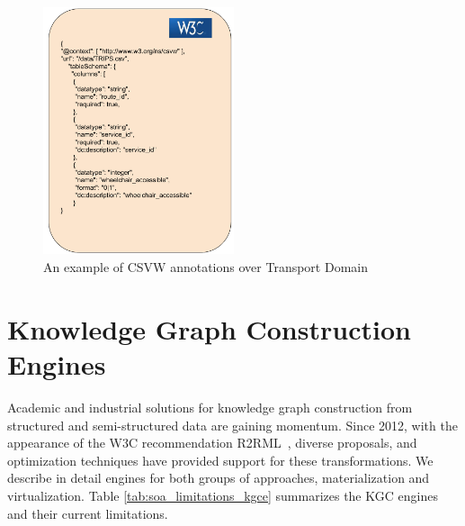 \begin{figure}[!t]
\centering
\includegraphics[width=0.5\textwidth]{figures/state-of-the-art/CVSW example.pdf}
\caption{An example of CSVW annotations over Transport Domain}
\label{fig:soa_csvw_example}
\end{figure}





\section{Knowledge Graph Construction Engines}
\label{sec:soa_engines}
Academic and industrial solutions for knowledge graph construction from structured and semi-structured data are gaining momentum. Since 2012, with the appearance of the W3C recommendation R2RML~\citep{R2RML}, diverse proposals, and optimization techniques have provided support for these transformations. We describe in detail engines for both groups of approaches, materialization and virtualization. Table \ref{tab:soa_limitations_kgce} summarizes the KGC engines and their current limitations.

